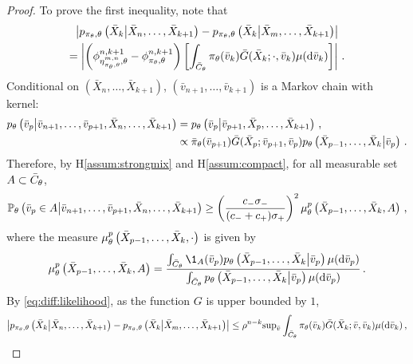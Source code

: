 \begin{proof}
To prove the first inequality, note that
\begin{multline}
\left|p_{\pi_{\theta},\theta}\left(\bar X_{k}\middle| \bar X_{n},\ldots,\bar X_{k+1}\right) - p_{\pi_{\theta},\theta}\left(\bar X_{k}\middle| \bar X_{m},\ldots,\bar X_{k+1}\right)\right|\\
= \left|\left(\phi^{n,k+1}_{\eta^{m,n}_{\pi_{\theta},\theta},\theta} - \phi^{n,k+1}_{\pi_{\theta},\theta}\right)\left[\int_{\bar C_{\theta}}\pi_{\theta}(\bar v_{k})\bar G(\bar X_{k};\cdot,\bar v_{k})\mu(\mathrm{d} \bar v_{k})\right]\right|\,.\label{eq:diff:likelihood}
\end{multline}
Conditional on $(\bar X_n,\ldots,\bar X_{k+1})$, $(\bar v_{n+1},\ldots,\bar v_{k+1})$ is a Markov chain with kernel:
\begin{align*}
p_{\theta}\left(\bar v_{p}\middle | \bar v_{n+1},\ldots, \bar v_{p+1},\bar X_n,\ldots,\bar X_{k+1}\right) &=  p_{\theta}\left(\bar v_{p}\middle |\bar v_{p+1},\bar X_p,\ldots,\bar X_{k+1}\right)\,,\\
&\propto \bar\pi_{\theta}(\bar v_{p+1}) \bar G(\bar X_{p};\bar v_{p+1},\bar v_{p})p_{\theta}\left(\bar X_{p-1},\ldots,\bar X_{k}\middle|\bar v_p\right)\,.
\end{align*}
Therefore, by H\ref{assum:strongmix} and H\ref{assum:compact}, for all measurable set $A\subset \bar C_{\theta}$,
\[
\mathbb{P}_{\theta}\left(\bar v_{p}\in A\middle | \bar v_{n+1},\ldots, \bar v_{p+1},\bar X_n,\ldots,\bar X_{k+1}\right) \ge \left(\frac{c_-\sigma_-}{(c_-+c_+)\sigma_+}\right)^2 \mu^p_{\theta}\left(\bar X_{p-1},\ldots,\bar X_{k},A\right)\,,
\]
where the measure $\mu^p_{\theta}\left(\bar X_{p-1},\ldots,\bar X_{k},\cdot\right)$ is given by
\[
\mu^p_{\param}\left(\bar X_{p-1},\ldots,\bar X_{k},A\right) = \frac{\int_{\bar C_{\param}} \1_{A}(\bar v_p)p_{\param}\left(\bar X_{p-1},\ldots,\bar X_{k}\middle|\bar v_p\right)\mu(\rmd \bar v_p)}{\int_{\bar C_{\param}} p_{\param}\left(\bar X_{p-1},\ldots,\bar X_{k}\middle|\bar v_p\right) \mu(\rmd \bar v_p)}\eqsp.
\]
By \eqref{eq:diff:likelihood}, as the function $G$ is upper bounded by $1$,
\begin{align*}
\left|p_{\pi_{\param},\param}\left(\bar X_{k}\middle| \bar X_{n},\ldots,\bar X_{k+1}\right) - p_{\pi_{\param},\param}\left(\bar X_{k}\middle| \bar X_{m},\ldots,\bar X_{k+1}\right)\right| &\le \rho^{n-k} \sup_{\bar v} \int_{\bar C_{\param}}\pi_{\param}(\bar v_{k})\bar G(\bar X_{k};\bar v,\bar v_{k})\mu(\rmd \bar v_{k})\eqsp,\\

\end{align*}
\end{proof}
